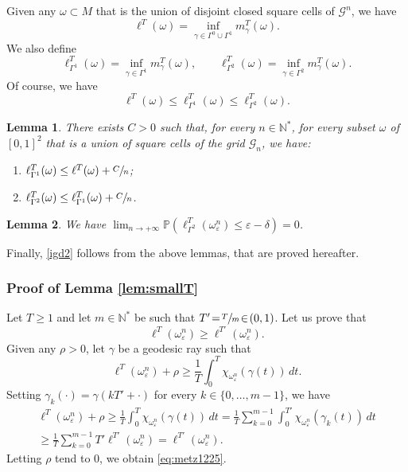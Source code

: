 \documentclass[10pt]{amsart}
\newenvironment{enumeratea}
{\bgroup\def\theenumi{\alph{enumi}}\begin{enumerate}}
{\end{enumerate}\egroup}
\def\N{\mathbb{N}}
\newtheorem{lemma}{Lemma}
\theoremstyle{definition}
\begin{document}
Given any $\omega\subset M$ that is the union of disjoint closed square cells of $\mathcal{G}^n$, we have
\[
\ell^T(\omega) = \inf_{\gamma\in \Gamma^0 \cup \Gamma^1} m^T_\gamma(\omega).
\]
We also define
\[
\ell_{\Gamma^1}^T(\omega) = \inf_{\gamma\in \Gamma^1} m^T_\gamma(\omega),\qquad
\ell_{\Gamma^2}^T(\omega) = \inf_{\gamma\in \Gamma^2} m^T_\gamma(\omega).
\]
Of course, we have
\[
\ell^T(\omega) \leq \ell_{\Gamma^1}^T(\omega) \leq \ell_{\Gamma^2}^T(\omega).
\]

\begin{lemma}\label{lem:compare}
There exists $C>0$ such that, for every $n\in\N^*$, for every subset $\omega$ of $[0,1]^2$ that is a union of square cells of the grid $\mathcal{G}_n$, we have:
\begin{enumeratea}
\item\label{lem:compareg2g3}
$\ell_{\Gamma^1}^T(\omega)\leq \ell^T(\omega) +\sfrac{C}{n}$;
\item\label{lem:compareg3g4}
$\ell_{\Gamma^2}^T(\omega)\leq \ell_{\Gamma^1}^T(\omega)+\sfrac{C}{n}$.
\end{enumeratea}
\end{lemma}

\begin{lemma}\label{lem:limprobg4}
We have $\displaystyle \lim_{n\to +\infty}\mathbb{P}\left(\ell_{\Gamma^2}^T(\omega_\varepsilon^n)\leq \varepsilon-\delta\right)=0$.
\end{lemma}

Finally, \eqref{igd2} follows from the above lemmas, that are proved hereafter.

\subsubsection{Proof of Lemma \ref{lem:smallT}}
Let $T\!\geq\!1$ and let $m\!\in\!\N^*$ be such that \hbox{$T'\!=\!\sfrac{T}{m}\!\in\!(0,1)$}.
Let us prove that
\begin{equation}\label{eq:metz1225}
\ell^T(\omega_\varepsilon^n) \geq \ell^{T'}(\omega_\varepsilon^n).
\end{equation}
Given any $\rho>0$, let $\gamma$ be a geodesic ray such that
\[
\ell^T(\omega_\varepsilon^n) + \rho \geq \frac{1}{T} \int_0^{T} \chi_{\omega_\varepsilon^n} (\gamma(t) ) \, dt.
\]
Setting $\gamma_k(\cdot)=\gamma(k T'+ \cdot)$ for every $k \in \{ 0, \ldots, m-1\}$, we have
\begin{multline*}
\ell^T(\omega_\varepsilon^n) + \rho \geq \frac{1}{T} \int_0^{T} \chi_{\omega_\varepsilon^n} (\gamma(t) ) \, dt = \frac{1}{T} \sum_{k=0}^{m-1} \int_0^{T'} \chi_{\omega_\varepsilon^n} (\gamma_k(t) ) \, dt\\[-5pt]
\geq \frac{1}{T} \sum_{k=0}^{m-1} T' \ell^{T'}(\omega_\varepsilon^n) = \ell^{T'}(\omega_\varepsilon^n).
\end{multline*}
Letting $\rho$ tend to 0, we obtain \eqref{eq:metz1225}.
\end{document}
